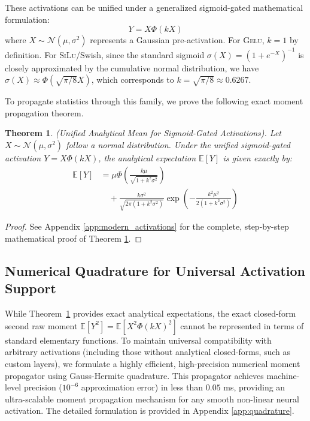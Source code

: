 \documentclass{article}
\theoremstyle{plain}
\newtheorem{theorem}{Theorem}[section]
\theoremstyle{definition}
\theoremstyle{remark}
\begin{document}
These activations can be unified under a generalized sigmoid-gated mathematical formulation:
\begin{equation}
    Y = X \Phi(k X)
\end{equation}
where $X \sim \mathcal{N}(\mu, \sigma^2)$ represents a Gaussian pre-activation. For \textsc{Gelu}, $k = 1$ by definition. For \textsc{SiLu}/Swish, since the standard sigmoid $\sigma(X) = (1+e^{-X})^{-1}$ is closely approximated by the cumulative normal distribution, we have $\sigma(X) \approx \Phi(\sqrt{\pi/8} X)$, which corresponds to $k = \sqrt{\pi/8} \approx 0.6267$.

To propagate statistics through this family, we prove the following exact moment propagation theorem.

\begin{theorem}
\label{thm:gelu_silu_mean}
(Unified Analytical Mean for Sigmoid-Gated Activations).
Let $X \sim \mathcal{N}(\mu, \sigma^2)$ follow a normal distribution. Under the unified sigmoid-gated activation $Y = X \Phi(k X)$, the analytical expectation $\mathbb{E}[Y]$ is given exactly by:
\begin{align}
    \mathbb{E}[Y] &= \mu \Phi\left(\frac{k \mu}{\sqrt{1+k^2\sigma^2}}\right) \nonumber \\
    & \quad + \frac{k\sigma^2}{\sqrt{2\pi(1+k^2\sigma^2)}} \exp\left(-\frac{k^2\mu^2}{2(1+k^2\sigma^2)}\right)
\end{align}
\end{theorem}

\begin{proof}
See Appendix \ref{app:modern_activations} for the complete, step-by-step mathematical proof of Theorem \ref{thm:gelu_silu_mean}.
\end{proof}

\subsection{Numerical Quadrature for Universal Activation Support}
\label{sec:quadrature}

While Theorem~\ref{thm:gelu_silu_mean} provides exact analytical expectations, the exact closed-form second raw moment $\mathbb{E}[Y^2] = \mathbb{E}[X^2 \Phi(k X)^2]$ cannot be represented in terms of standard elementary functions. To maintain universal compatibility with arbitrary activations (including those without analytical closed-forms, such as custom layers), we formulate a highly efficient, high-precision numerical moment propagator using Gauss-Hermite quadrature. This propagator achieves machine-level precision ($10^{-6}$ approximation error) in less than $0.05$ ms, providing an ultra-scalable moment propagation mechanism for any smooth non-linear neural activation. The detailed formulation is provided in Appendix \ref{app:quadrature}.
\end{document}
